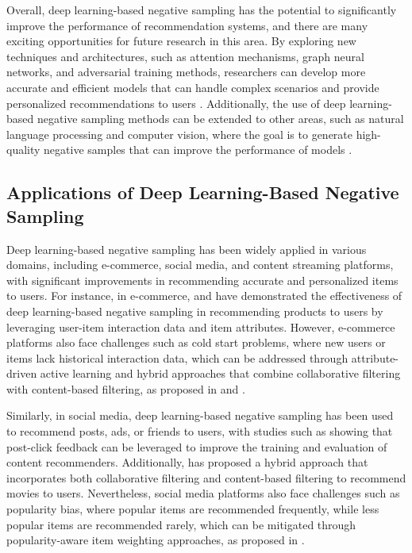 \documentclass[11pt,a4paper]{article}
\begin{document}
Overall, deep learning-based negative sampling has the potential to significantly improve the performance of recommendation systems, and there are many exciting opportunities for future research in this area. By exploring new techniques and architectures, such as attention mechanisms, graph neural networks, and adversarial training methods, researchers can develop more accurate and efficient models that can handle complex scenarios and provide personalized recommendations to users \cite{doi:10.1016/j.neucom.2018.01.057}. Additionally, the use of deep learning-based negative sampling methods can be extended to other areas, such as natural language processing and computer vision, where the goal is to generate high-quality negative samples that can improve the performance of models \cite{doi:10.1109/access.2020.2975167}.


\subsection{Applications of Deep Learning-Based Negative Sampling}


Deep learning-based negative sampling has been widely applied in various domains, including e-commerce, social media, and content streaming platforms, with significant improvements in recommending accurate and personalized items to users. For instance, in e-commerce, \cite{doi:10.1155/2009/421425} and \cite{arxiv:1707.07435} have demonstrated the effectiveness of deep learning-based negative sampling in recommending products to users by leveraging user-item interaction data and item attributes. However, e-commerce platforms also face challenges such as cold start problems, where new users or items lack historical interaction data, which can be addressed through attribute-driven active learning and hybrid approaches that combine collaborative filtering with content-based filtering, as proposed in \cite{doi:10.1016/j.knosys.2011.07.021} and \cite{arxiv:1805.09023}.

Similarly, in social media, deep learning-based negative sampling has been used to recommend posts, ads, or friends to users, with studies such as \cite{doi:10.1145/3298689.3347037} showing that post-click feedback can be leveraged to improve the training and evaluation of content recommenders. Additionally, \cite{doi:10.1145/3357384.3357868} has proposed a hybrid approach that incorporates both collaborative filtering and content-based filtering to recommend movies to users. Nevertheless, social media platforms also face challenges such as popularity bias, where popular items are recommended frequently, while less popular items are recommended rarely, which can be mitigated through popularity-aware item weighting approaches, as proposed in \cite{arxiv:1802.05382}.
\end{document}
